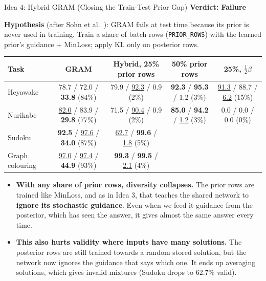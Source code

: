 \documentclass[aspectratio=169,10pt]{beamer}
\newcommand{\secbest}[1]{\underline{#1}}
\newcommand{\verdictfail}{\textcolor{accentred}{\textbf{Verdict: Failure}}}
\begin{document}
\begin{frame}{Idea 4: Hybrid GRAM (Closing the Train-Test Prior Gap)}
  \verdictfail

  \vspace{0.2em}
  \footnotesize
  \textbf{Hypothesis} (after Sohn et al.~\cite{sohn2015}): GRAM fails at test time because its prior is never used in training. Train a share of batch rows (\texttt{PRIOR\_ROWS}) with the learned prior's guidance + MinLoss; apply KL only on posterior rows.

  \vspace{0.3em}
  \centering
  \scriptsize
  {\setlength{\tabcolsep}{4.5pt}%
  \begin{tabular}{@{}lcccc@{}}
    \toprule
    \textbf{Task} & \textbf{GRAM} & \textbf{Hybrid, 25\% prior rows} & \textbf{50\% prior rows} & \textbf{25\%, $\frac{1}{2}\beta$} \\
    \midrule
    Heyawake & 78.7 / 72.0 / \textbf{33.8} (84\%) & 79.9 / \secbest{92.3} / 0.9 (2\%) & \textbf{92.3} / \textbf{95.3} / 1.2 (3\%) & \secbest{91.3} / 88.7 / \secbest{6.2} (15\%) \\
    Nurikabe & \secbest{82.0} / 83.9 / \textbf{29.8} (77\%) & 71.5 / \secbest{90.4} / 0.9 (2\%) & \textbf{85.0} / \textbf{94.2} / \secbest{1.2} (3\%) & 0.0 / 0.0 / 0.0 (0\%) \\
    Sudoku & \textbf{92.5} / \secbest{97.6} / \textbf{34.0} (87\%) & \secbest{62.7} / \textbf{99.6} / \secbest{1.8} (5\%) & & \\
    Graph colouring & \secbest{97.0} / \secbest{97.4} / \textbf{44.9} (93\%) & \textbf{99.3} / \textbf{99.5} / \secbest{2.1} (4\%) & & \\
    \bottomrule
  \end{tabular}}
  \raggedright\footnotesize
  \begin{itemize}\setlength{\itemsep}{0.3em}
    \item \textbf{With any share of prior rows, diversity collapses.} The prior rows are trained like MinLoss, and as in Idea 3, that teaches the shared network to \textbf{ignore its stochastic guidance}. Even when we feed it guidance from the posterior, which has seen the answer, it gives almost the same answer every time.
    \item \textbf{This also hurts validity where inputs have many solutions.} The posterior rows are still trained towards a random stored solution, but the network now ignores the guidance that says which one. It ends up averaging solutions, which gives invalid mixtures (Sudoku drops to 62.7\% valid).
  \end{itemize}
\end{frame}
\end{document}
